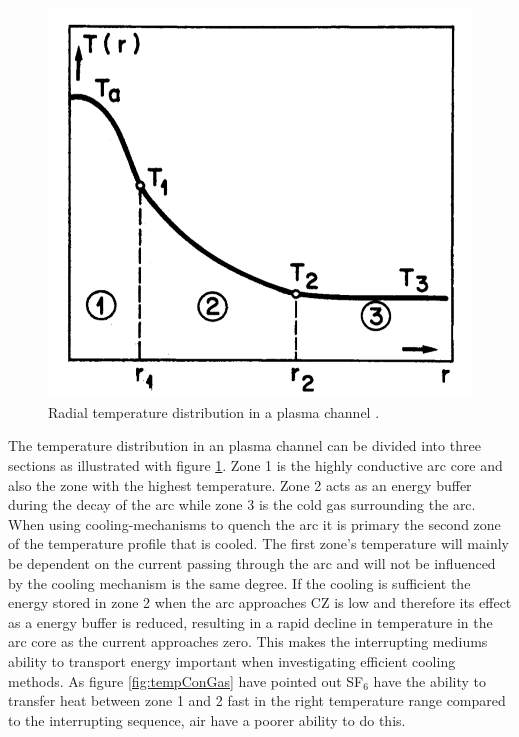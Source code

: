 \documentclass[10pt,a4paper,twoside]{article}
\begin{document}
\begin{figure}[H]
\centering
\includegraphics[scale=0.3]{Bilder/Theory/tempZonesArc.png}
\caption{Radial temperature distribution in a plasma channel \cite{bib:TDCIGBB}.} \label{fig:tempDist1}
\end{figure}

The temperature distribution in an plasma channel can be divided into three sections \cite{bib:TDCIGBB} as illustrated with figure \ref{fig:tempDist1}. Zone 1 is the highly conductive arc core and also the zone with the highest temperature. Zone 2 acts as an energy buffer during the decay of the arc while zone 3 is the cold gas surrounding the arc. When using cooling-mechanisms to quench the arc it is primary the second zone of the temperature profile that is cooled. The first zone's temperature will mainly be dependent on the current passing through the arc and will not be influenced by the cooling mechanism is the same degree. If the cooling is sufficient the energy stored in zone 2 when the arc approaches CZ is low and therefore its effect as a energy buffer is reduced, resulting in a rapid decline in temperature in the arc core as the current approaches zero. This makes the interrupting mediums ability to transport energy important when investigating efficient cooling methods. As figure \ref{fig:tempConGas} have pointed out SF$_6$ have the ability to transfer heat between zone 1 and 2 fast in the right temperature range compared to the interrupting sequence, air have a poorer ability to do this.
\end{document}
